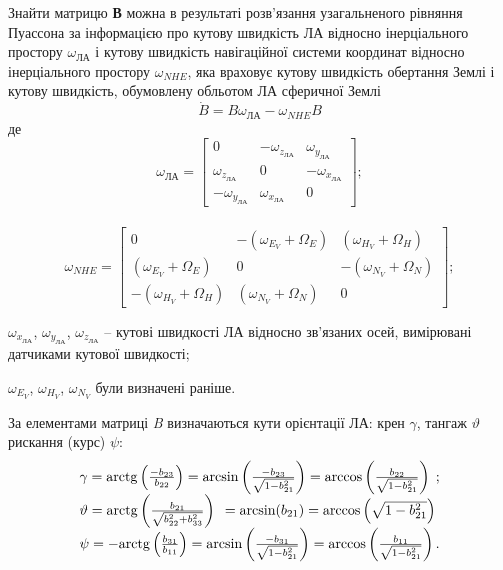 Знайти матрицю \textbf{В} можна в результаті розв'язання 
узагальненого рівняння Пуассона за інформацією про кутову швидкість ЛА відносно інерціального 
простору $\omega_{\text{ЛА}}$ і кутову швидкість навігаційної системи координат відносно 
інерціального простору $\omega_{NHE}$, яка враховує кутову швидкість 
обертання Землі і кутову швидкість, обумовлену обльотом ЛА сферичної Землі 
\[  \dot{B}=B\omega_{\text{ЛА}} -\omega_{NHE}B\] 
де 
\[\omega_{\text{ЛА}} =\left[\begin{array}{ccc} 
{0} & {-\omega_{z_{\text{ЛА}} } } & {\omega_{y_{\text{ЛА}}}} \\ 
{\omega_{z_{\text{ЛА}} } } & {0} & {-\omega_{x_{\text{ЛА}}}} \\ 
{-\omega_{y_{\text{ЛА}} } } & {\omega_{x_{\text{ЛА}} } } & {0} 
\end{array}\right];\]\\
\[\omega_{NHE} =\left[\begin{array}{ccc} 
{0} & {-(\omega_{E_{V} } +\Omega_{E} )} & {(\omega_{H_{V} } +\Omega_{H} )} \\ 
{(\omega_{E_{V} } +\Omega_{E})} & {0} & {-(\omega_{N_{V} } +\Omega_{N} )} \\ 
{-(\omega_{H_{V} } +\Omega_{H})}& {(\omega_{N_{V} } +\Omega_{N} )} & {0} 
\end{array}\right];\] 
\begin{ESKDexplanation}
  \item $\omega_{x_{\text{ЛА}}}$, $\omega_{y_{\text{ЛА}}}$, $\omega_{z_{\text{ЛА}}}$  -- кутові 
  швидкості ЛА відносно зв'язаних осей, вимірювані датчиками кутової швидкості; 
  \item $\omega_{E_{V} }$, $\omega_{H_{V} }$, $\omega_{N_{V}}$ були визначені раніше.
\end{ESKDexplanation}
За елементами матриці  \textit{B} визначаються кути орієнтації ЛА: крен $\gamma$, тангаж 
$\vartheta$ рискання (курс) $\psi $: 
\begin{equation} 
\label{eq:angels} 
\begin{array}{l} 
{\gamma ={\rm arctg}\left(
\frac{-b_{23} }{b_{22} } \right)={\rm arcsin}\left(\frac{-b_{23} }{\sqrt{1-b_{21}^{2} 
} } \right)={\rm arccos}\left(\frac{b_{22} }{\sqrt{1-b_{21}^{2} } } \right)\; ; 
} \\ 
{\vartheta ={\rm arctg}\left(\frac{b_{21} }{\sqrt{b_{22}^{2} +b_{33}^{2} } } 
\right){\rm \; }={\rm arcsin(}b_{21} {\rm )}={\rm arccos}\left(\sqrt{1-b_{21}^{2} 
} \right)} \\ 
{\psi =-{\rm arctg}\left(\frac{b_{31} }{b_{11} } \right)={
\rm arcsin}\left(\frac{-b_{31} }{\sqrt{1-b_{21}^{2} } } \right)={\rm arccos}\left(
\frac{b_{11} }{\sqrt{1-b_{21}^{2} } } \right).} 
\end{array} 
\end{equation} 
